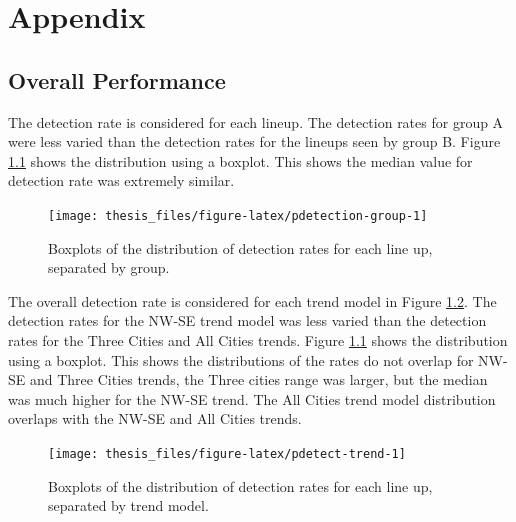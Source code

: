 \documentclass{monashthesis}
\begin{document}
\printbibliography[heading=bibintoc]

\appendix
\renewcommand\thesubsection{\thesection.\Alph{subsection}}

\hypertarget{appendix}{%
\chapter{Appendix}\label{appendix}}

\hypertarget{overall-performance}{%
\section{Overall Performance}\label{overall-performance}}

The detection rate is considered for each lineup. The detection rates for group A were less varied than the detection rates for the lineups seen by group B. Figure \ref{fig:pdetection-group} shows the distribution using a boxplot. This shows the median value for detection rate was extremely similar.

\begin{figure}

{\centering \texttt{[image: thesis\_files/figure-latex/pdetection-group-1]} 

}

\caption{Boxplots of the distribution of detection rates for each line up, separated by group.}\label{fig:pdetection-group}
\end{figure}

The overall detection rate is considered for each trend model in Figure \ref{fig:pdetect-trend}.
The detection rates for the NW-SE trend model was less varied than the detection rates for the Three Cities and All Cities trends. Figure \ref{fig:pdetection-group} shows the distribution using a boxplot. This shows the distributions of the rates do not overlap for NW-SE and Three Cities trends, the Three cities range was larger, but the median was much higher for the NW-SE trend. The All Cities trend model distribution overlaps with the NW-SE and All Cities trends.

\begin{figure}

{\centering \texttt{[image: thesis\_files/figure-latex/pdetect-trend-1]} 

}

\caption{Boxplots of the distribution of detection rates for each line up, separated by trend model.}\label{fig:pdetect-trend}
\end{figure}
\end{document}
